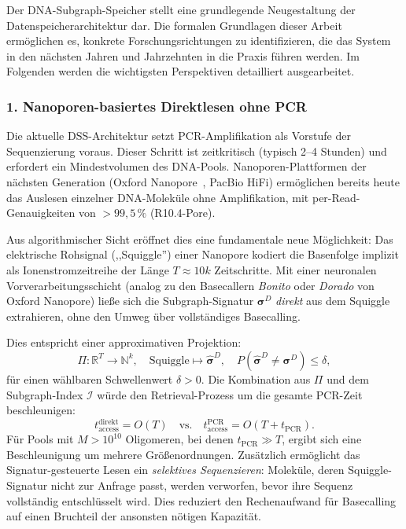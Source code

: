 ﻿\documentclass[a4paper,12pt]{article}
\theoremstyle{definition}
\begin{document}
Der DNA-Subgraph-Speicher stellt eine grundlegende Neugestaltung der
Datenspeicherarchitektur dar.
Die formalen Grundlagen dieser Arbeit erm\"{o}glichen es, konkrete
Forschungsrichtungen zu identifizieren, die das System in den n\"{a}chsten
Jahren und Jahrzehnten in die Praxis f\"{u}hren werden.
Im Folgenden werden die wichtigsten Perspektiven detailliert ausgearbeitet.

\subsubsection*{1.\; Nanoporen-basiertes Direktlesen ohne PCR}

Die aktuelle DSS-Architektur setzt PCR-Amplifikation als Vorstufe der
Sequenzierung voraus. Dieser Schritt ist zeitkritisch (typisch 2--4 Stunden)
und erfordert ein Mindestvolumen des DNA-Pools. Nanoporen-Plattformen der
n\"{a}chsten Generation (Oxford Nanopore~\cite{deamer2016}, PacBio HiFi)
erm\"{o}glichen bereits heute das Auslesen einzelner DNA-Molek\"{u}le ohne
Amplifikation, mit per-Read-Genauigkeiten von $> 99{,}5\,\%$ (R10.4-Pore).

Aus algorithmischer Sicht er\"{o}ffnet dies eine fundamentale neue M\"{o}glichkeit:
Das elektrische Rohsignal (,,Squiggle'') einer Nanopore kodiert die Basenfolge
implizit als Ionenstromzeitreihe der L\"{a}nge $T \approx 10k$ Zeitschritte.
Mit einer neuronalen Vorverarbeitungsschicht (analog zu den Basecallern
\emph{Bonito} oder \emph{Dorado} von Oxford Nanopore) lie\ss{}e sich die
Subgraph-Signatur $\boldsymbol{\sigma}^D$ \emph{direkt} aus dem Squiggle
extrahieren, ohne den Umweg \"{u}ber vollst\"{a}ndiges Basecalling.

Dies entspricht einer approxi\-mativen Projektion:
\[
    \Pi: \mathbb{R}^{T} \to \mathbb{N}^k,
    \quad \text{Squiggle} \mapsto \hat{\boldsymbol{\sigma}}^D,
    \quad P(\hat{\boldsymbol{\sigma}}^D \neq \boldsymbol{\sigma}^D) \le \delta,
\]
f\"{u}r einen w\"{a}hlbaren Schwellenwert $\delta > 0$.
Die Kombination aus $\Pi$ und dem Subgraph-Index $\mathcal{I}$ w\"{u}rde
den Retrieval-Prozess um die gesamte PCR-Zeit beschleunigen:
\[
    t_{\mathrm{access}}^{\mathrm{direkt}} = O(T)
    \quad \text{vs.} \quad
    t_{\mathrm{access}}^{\mathrm{PCR}} = O(T + t_{\mathrm{PCR}}).
\]
F\"{u}r Pools mit $M > 10^{10}$ Oligomeren, bei denen $t_{\mathrm{PCR}} \gg T$,
ergibt sich eine Beschleunigung um mehrere Gr\"{o}\ss{}enordnungen.
Zus\"{a}tzlich erm\"{o}glicht das Signatur-gesteuerte Lesen ein
\emph{selektives Sequenzieren}: Molek\"{u}le, deren Squiggle-Signatur nicht
zur Anfrage passt, werden verworfen, bevor ihre Sequenz vollst\"{a}ndig
entschl\"{u}sselt wird. Dies reduziert den Rechenaufwand f\"{u}r Basecalling
auf einen Bruchteil der ansonsten n\"{o}tigen Kapazit\"{a}t.
\end{document}
